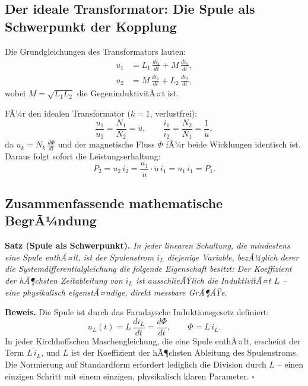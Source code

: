 ﻿\documentclass[12pt, a4paper]{article}
\begin{document}
	\subsection{Der ideale Transformator: Die Spule als Schwerpunkt der Kopplung}
	\label{sec:schwerpunkt_trafo}
	
	Die Grundgleichungen des Transformators lauten:
	\begin{align}
		u_1 &= L_1\,\frac{di_1}{dt} + M\,\frac{di_2}{dt}, \label{eq:trafo_prim} \\
		u_2 &= M\,\frac{di_1}{dt} + L_2\,\frac{di_2}{dt}, \label{eq:trafo_sek}
	\end{align}
	wobei $M = \sqrt{L_1 L_2}$ die GegeninduktivitÃ¤t ist.
	
	FÃ¼r den idealen Transformator ($k = 1$, verlustfrei):
	\begin{equation}
		\frac{u_1}{u_2} = \frac{N_1}{N_2} = \ddot{u}, \qquad
		\frac{i_1}{i_2} = \frac{N_2}{N_1} = \frac{1}{\ddot{u}},
		\label{eq:trafo_ue}
	\end{equation}
	da $u_k = N_k\,\frac{d\Phi}{dt}$ und der magnetische Fluss $\Phi$ fÃ¼r beide
	Wicklungen identisch ist. Daraus folgt sofort die Leistungserhaltung:
	\begin{equation}
		P_2 = u_2\,i_2 = \frac{u_1}{\ddot{u}} \cdot \ddot{u}\,i_1 = u_1\,i_1 = P_1.
	\end{equation}
	
	\subsection{Zusammenfassende mathematische BegrÃ¼ndung}
	\label{sec:spule_schwerpunkt_begruendung}
	
	\textbf{Satz (Spule als Schwerpunkt).}
	\textit{In jeder linearen Schaltung, die mindestens eine Spule enthÃ¤lt,
		ist der Spulenstrom $i_L$ diejenige Variable, bezÃ¼glich derer die
		Systemdifferentialgleichung die folgende Eigenschaft besitzt: Der Koeffizient
		der hÃ¶chsten Zeitableitung von $i_L$ ist ausschlieÃŸlich die InduktivitÃ¤t $L$
		-- eine physikalisch eigenstÃ¤ndige, direkt messbare GrÃ¶ÃŸe.}
	
	\textbf{Beweis.}
	Die Spule ist durch das Faradaysche Induktionsgesetz definiert:
	\begin{equation}
		u_L(t) = L\,\frac{di_L}{dt} = \frac{d\Phi}{dt},
		\qquad \Phi = L\,i_L.
		\label{eq:faraday}
	\end{equation}
	In jeder Kirchhoffschen Maschengleichung, die eine Spule enthÃ¤lt, erscheint der
	Term $L\,\dot{i}_L$, und $L$ ist der Koeffizient der hÃ¶chsten Ableitung
	des Spulenstroms. Die Normierung auf Standardform erfordert lediglich die
	Division durch $L$ -- einen einzigen Schritt mit einem einzigen,
	physikalisch klaren Parameter. $\square$
	
\end{document}
